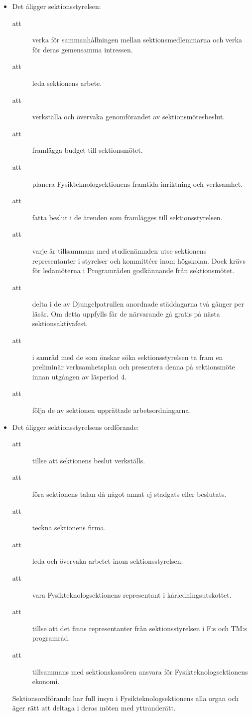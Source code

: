 \documentclass[11pt,a4paper]{article}
\newlength{\sectitlew}\setlength{\sectitlew}{14mm} %
\newcounter{par}[subsubsection] %
\renewcommand\thepar{\thelevel.\arabic{par}} %
\newcommand{\pgf}{\refstepcounter{par} \item[\textsl{\thepar}]} %
\begin{document}
\begin{itemize}[leftmargin=\sectitlew]
	\subsection{Åligganden}
		\pgf Det åligger sektionsstyrelsen:
			\begin{description}
				\item[att] verka för sammanhållningen mellan sektionsmedlemmarna och verka för deras gemensamma intressen.
				\item[att] leda sektionens arbete.
				\item[att] verkställa och övervaka genomförandet av sektionsmötesbeslut.
				\item[att] framlägga budget till sektionsmötet.
				\item[att] planera Fysikteknologsektionens framtida inriktning och verksamhet.
				\item[att] fatta beslut i de ärenden som framlägges till sektionsstyrelsen.
				\item[att] varje år tillsammans med studienämnden utse sektionens representanter i styrelser och kommittéer inom högskolan. Dock krävs för ledamöterna i Programråden godkännande från sektionsmötet.
				\item[att] delta i de av Djungelpatrullen anordnade städdagarna två gånger per läsår. Om detta uppfylls får de närvarande gå gratis på nästa sektionsaktivafest.
				\item[att] i samråd med de som önskar söka sektionsstyrelsen ta fram en preliminär verksamhetsplan och presentera denna på sektionsmöte innan utgången av läsperiod 4.
				\item[att] följa de av sektionen upprättade arbetsordningarna.
			\end{description}

		\pgf Det åligger sektionsstyrelsens ordförande:
			\begin{description}
				\item[att] tillse att sektionens beslut verkställs.
				\item[att] föra sektionens talan då något annat ej stadgats eller beslutats.
				\item[att] teckna sektionens firma.
				\item[att] leda och övervaka arbetet inom sektionsstyrelsen.
				\item[att] vara Fysikteknologsektionens representant i kårledningsutskottet.
				\item[att] tillse att det finns representanter från sektionsstyrelsen i F:s och TM:s programråd.
				\item[att] tillsammans med sektionskassören ansvara för Fysikteknologsektionens ekonomi.
			\end{description}
            \noindent Sektionsordförande har full insyn i Fysikteknologsektionens alla organ och äger rätt att deltaga i deras möten med yttranderätt.


\end{itemize}
\end{document}
